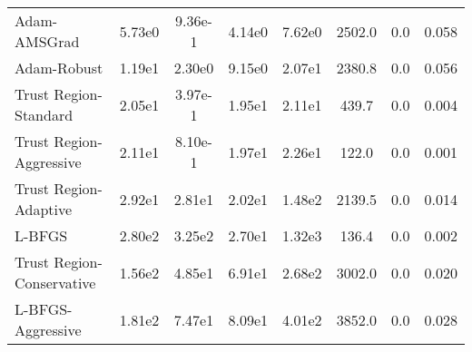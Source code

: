 \documentclass{article}
\begin{document}
\begin{table}[htbp]
{\begin{tabular}{p{2.5cm}*{7}{c}}
Adam-AMSGrad & 5.73e0 & 9.36e-1 & 4.14e0 & 7.62e0 & 2502.0 & 0.0 & 0.058 \\
Adam-Robust & 1.19e1 & 2.30e0 & 9.15e0 & 2.07e1 & 2380.8 & 0.0 & 0.056 \\
Trust Region-Standard & 2.05e1 & 3.97e-1 & 1.95e1 & 2.11e1 & 439.7 & 0.0 & 0.004 \\
Trust Region-Aggressive & 2.11e1 & 8.10e-1 & 1.97e1 & 2.26e1 & 122.0 & 0.0 & 0.001 \\
Trust Region-Adaptive & 2.92e1 & 2.81e1 & 2.02e1 & 1.48e2 & 2139.5 & 0.0 & 0.014 \\
L-BFGS & 2.80e2 & 3.25e2 & 2.70e1 & 1.32e3 & 136.4 & 0.0 & 0.002 \\
Trust Region-Conservative & 1.56e2 & 4.85e1 & 6.91e1 & 2.68e2 & 3002.0 & 0.0 & 0.020 \\
L-BFGS-Aggressive & 1.81e2 & 7.47e1 & 8.09e1 & 4.01e2 & 3852.0 & 0.0 & 0.028 \\
\bottomrule
\end{tabular}
}
\end{table}
\end{document}
